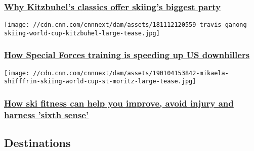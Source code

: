 \hypertarget{why-kitzbuhels-classics-offer-skiings-biggest-party}{%
\subsubsection{\texorpdfstring{\href{/2019/01/25/sport/kitzbuhel-skiing-downhill-hahnenkamm-world-cup-party-spt-intl/index.html}{Why
Kitzbuhel's classics offer skiing's biggest
party}}{Why Kitzbuhel's classics offer skiing's biggest party}}\label{why-kitzbuhels-classics-offer-skiings-biggest-party}}

\href{/2018/11/16/sport/us-skiing-world-cup-downhill-coach-john-mcbride-spt-intl/index.html}{}

\texttt{[image: //cdn.cnn.com/cnnnext/dam/assets/181112120559-travis-ganong-skiing-world-cup-kitzbuhel-large-tease.jpg]}

\hypertarget{how-special-forces-training-is-speeding-up-us-downhillers}{%
\subsubsection{\texorpdfstring{\href{/2018/11/16/sport/us-skiing-world-cup-downhill-coach-john-mcbride-spt-intl/index.html}{How
Special Forces training is speeding up US
downhillers}}{How Special Forces training is speeding up US downhillers}}\label{how-special-forces-training-is-speeding-up-us-downhillers}}

\href{/2019/01/04/sport/ski-fitness-training-alpine-edge-spt-intl/index.html}{}

\texttt{[image: //cdn.cnn.com/cnnnext/dam/assets/190104153842-mikaela-shifffrin-skiing-world-cup-st-moritz-large-tease.jpg]}

\hypertarget{how-ski-fitness-can-help-you-improve-avoid-injury-and-harness-sixth-sense}{%
\subsubsection{\texorpdfstring{\href{/2019/01/04/sport/ski-fitness-training-alpine-edge-spt-intl/index.html}{How
ski fitness can help you improve, avoid injury and harness 'sixth
sense'}}{How ski fitness can help you improve, avoid injury and harness 'sixth sense'}}\label{how-ski-fitness-can-help-you-improve-avoid-injury-and-harness-sixth-sense}}

\hypertarget{destinations-}{%
\subsection{Destinations~}\label{destinations-}}

